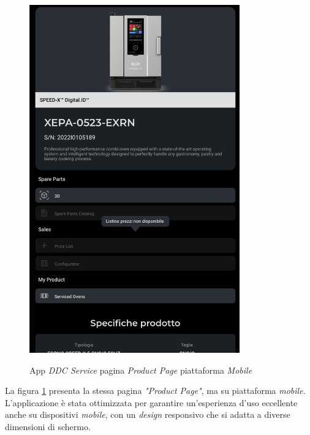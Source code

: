 \begin{figure}[H]
    \centering
    \includegraphics[alt={Screenshot della pagina \textit{"Product Page"} su piattaforma \textit{mobile}}, height=15cm]{img/ProductPageMobile}
    \caption{App \textit{DDC Service} pagina \textit{Product Page} piattaforma \textit{Mobile}}
    \label{fig:productpagemobile}
\end{figure}

La figura \ref{fig:productpagemobile} presenta la stessa pagina \textit{"Product Page"}, ma su piattaforma \textit{mobile}.
L'applicazione è stata ottimizzata per garantire un'esperienza d'uso eccellente anche su dispositivi \textit{mobile}, con un \textit{design} responsivo che si adatta a diverse dimensioni di schermo.

